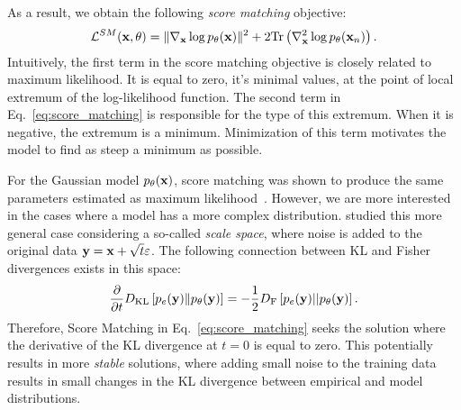 As a result, we obtain the following \textit{score matching} objective:
\begin{equation}\label{eq:score_matching}
\begin{aligned}
\mathcal{L}^{SM}(\rvx, \theta)   =  \|\nabla_{\rvx}\log p_{\theta}(\rvx)\|^2 + 2\text{Tr}\left(\nabla^2_{\rvx}\log p_{\theta}(\rvx_n)\right).
\end{aligned}
\end{equation}
Intuitively, the first term in the score matching objective is closely related to maximum likelihood. It is equal to zero, it's minimal values, at the point of local extremum of the log-likelihood function. The second term in Eq.~\ref{eq:score_matching} is responsible for the type of this extremum. When it is negative, the extremum is a minimum. Minimization of this term motivates the model to find as steep a minimum as possible. 

For the Gaussian model $p_{\theta}({\mathbf{x}})$, score matching was shown to produce the same parameters estimated as maximum likelihood~\citep{hyvarinen2005estimation}. However, we are more interested in the cases where a model has a more complex distribution. \citet{lyu2009interpretation} studied this more general case considering a so-called \textit{scale space}, where noise is added to the original data ${\mathbf{y}} = {\mathbf{x}} + \sqrt{t}\varepsilon$. The following connection between KL and Fisher divergences exists in this space:
\begin{equation}
    \frac{\partial}{\partial t} D_{\mathrm{KL}}\left[p_e({\mathbf{y}})\|p_{\theta}({\mathbf{y}})\right] = -\frac12 D_{\text{F}}\left[p_{e}({\mathbf{y}})||p_{\theta}({\mathbf{y}})\right].
\end{equation}
Therefore, Score Matching in Eq.~\ref{eq:score_matching} seeks the solution where the derivative of the KL divergence at $t=0$ is equal to zero.
This potentially results in more \textit{stable} solutions, where adding small noise to the training data results in small changes in the KL divergence between empirical and model distributions. 



